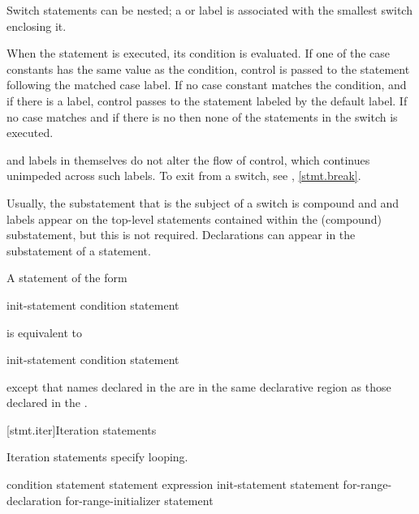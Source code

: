\pnum
Switch statements can be nested; a  or  label
is associated with the smallest switch enclosing it.

\pnum
When the  statement is executed, its condition is
evaluated.
%
If one of the case constants has the same value as the condition,
control is passed to the statement following the matched case label. If
no case constant matches the condition, and if there is a
%
 label, control passes to the statement labeled by the
default label. If no case matches and if there is no 
then none of the statements in the switch is executed.

\pnum
{} and  labels in themselves do not alter the
flow of control, which continues unimpeded across such labels. To exit
from a switch, see , \ref{stmt.break}.
\begin{note}
Usually, the substatement that is the subject of a switch is compound
and  and  labels appear on the top-level
statements contained within the (compound) substatement, but this is not
required.
%
Declarations can appear in the substatement of a
 statement.
\end{note}

\pnum
A  statement of the form
\begin{ncsimplebnf}
 \terminal{(} init-statement condition \terminal{)} statement
\end{ncsimplebnf}
is equivalent to
\begin{ncsimplebnf}
\terminal{\{}\br
\bnfindent init-statement\br
\bnfindent {} \terminal{(} condition \terminal{)} statement\br
\terminal{\}}
\end{ncsimplebnf}
except that names declared in the  are in
the same declarative region as those declared in the
.%

[stmt.iter]{Iteration statements}%

\pnum
Iteration statements specify looping.

%
%
%
%
\begin{bnf}
\br
     \terminal{(} condition \terminal{)} statement\br
     statement  \terminal{(} expression \terminal{)} \terminal{;}\br
     \terminal{(} init-statement  \terminal{;}  \terminal{)} statement\br
     \terminal{(}  for-range-declaration \terminal{:} for-range-initializer \terminal{)} statement
\end{bnf}

